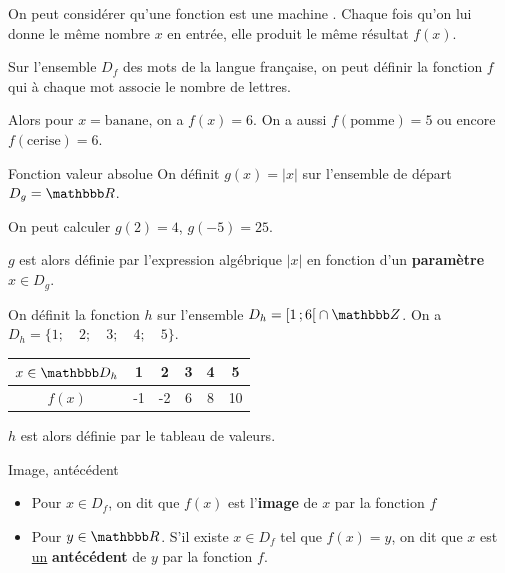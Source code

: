 \documentclass[10pt,a4paper,openany,twoside,prof]{book}
\begin{document}
\begin{rem}{}{}
    On peut considérer qu'une fonction est une \og machine \fg. Chaque fois qu'on lui donne le même nombre $x$ en entrée, elle produit le même résultat $f(x)$.
\end{rem}

\begin{ex}{}{}
    Sur l'ensemble $D_f$ des mots de la langue française, on peut définir la fonction $f$  qui à chaque mot associe le nombre de lettres.

    Alors pour $x=\text{banane}$, on a $f(x) = 6$. On a aussi $f(\text{pomme}) = 5$ ou encore $f(\text{cerise})=6$.
\end{ex}

\begin{defi}{Fonction valeur absolue}{}
    On définit $g(x) = |x|$ sur l'ensemble de départ $D_g=\R$.
\end{defi}

\begin{ex}{}{}
    On peut calculer $g(2)=4$, $g(-5)=25$.

    $g$ est alors définie par l'expression algébrique $|x|$ en fonction d'un \textbf{paramètre} $x\in D_g$.
\end{ex}

\begin{ex}{}{}
    On définit la fonction $h$ sur l'ensemble $D_h = \fo{1}{6} \cap \Z$. On a $D_h = \{1;\quad 2;\quad 3;\quad 4;\quad 5\}$.

    \begin{tabular}{*{6}{|c}|}
        \hline
        $x\in\D_h$ & 1 & 2 & 3 & 4 & 5 \\
        \hline
        $f(x)$ & -1 & -2 & 6 & 8 & 10 \\
        \hline
    \end{tabular}

    $h$ est alors définie par le tableau de valeurs.
\end{ex}

\begin{defi}{Image, antécédent}{}
    \begin{itemize}
        \item
              Pour $x\in D_f$, on dit que $f(x)$ est l'\textbf{image} de $x$ par la fonction $f$
        \item
              Pour $y\in\R$. S'il existe $x\in D_f$ tel que $f(x)=y$, on dit que $x$ est \underline{un} \textbf{antécédent} de $y$ par la fonction $f$.
    \end{itemize}
\end{defi}
\end{document}
